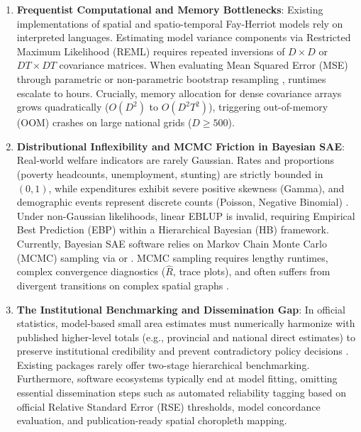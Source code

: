 \begin{enumerate}
  \item \textbf{Frequentist Computational and Memory Bottlenecks}: Existing implementations of spatial and spatio-temporal Fay-Herriot models rely on interpreted languages. Estimating model variance components via Restricted Maximum Likelihood (REML) requires repeated inversions of $D \times D$ or $DT \times DT$ covariance matrices. When evaluating Mean Squared Error (MSE) through parametric or non-parametric bootstrap resampling \citep{gonzalez2008bootstrap}, runtimes escalate to hours. Crucially, memory allocation for dense covariance arrays grows quadratically ($O(D^2)$ to $O(D^2 T^2)$), triggering out-of-memory (OOM) crashes on large national grids ($D \ge 500$).
  \item \textbf{Distributional Inflexibility and MCMC Friction in Bayesian SAE}: Real-world welfare indicators are rarely Gaussian. Rates and proportions (poverty headcounts, unemployment, stunting) are strictly bounded in $(0, 1)$, while expenditures exhibit severe positive skewness (Gamma), and demographic events represent discrete counts (Poisson, Negative Binomial) \citep{janicki2020properties, fabrizi2011hierarchical, boubeta2016empirical}. Under non-Gaussian likelihoods, linear EBLUP is invalid, requiring Empirical Best Prediction (EBP) within a Hierarchical Bayesian (HB) framework. Currently, Bayesian SAE software relies on Markov Chain Monte Carlo (MCMC) sampling via  or  \citep{denicolo2022tipsae}. MCMC sampling requires lengthy runtimes, complex convergence diagnostics ($\hat{R}$, trace plots), and often suffers from divergent transitions on complex spatial graphs \citep{simpson2017penalising}.
  \item \textbf{The Institutional Benchmarking and Dissemination Gap}: In official statistics, model-based small area estimates must numerically harmonize with published higher-level totals (e.g., provincial and national direct estimates) to preserve institutional credibility and prevent contradictory policy decisions \citep{you2002small, wang2008small, stefan2020benchmarking}. Existing packages rarely offer two-stage hierarchical benchmarking. Furthermore, software ecosystems typically end at model fitting, omitting essential dissemination steps such as automated reliability tagging based on official Relative Standard Error (RSE) thresholds, model concordance evaluation, and publication-ready spatial choropleth mapping.
\end{enumerate}

